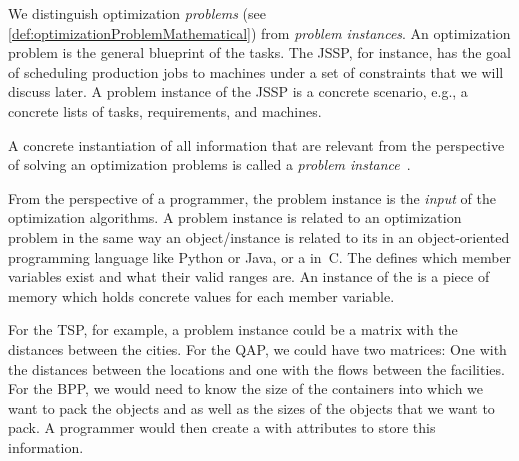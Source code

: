 %
\label{sec:problemInstance}%
%
%
%
We distinguish optimization \emph{problems} (see \autoref{def:optimizationProblemMathematical}) from \emph{problem instances}.
An optimization problem is the general blueprint of the tasks.
The \gls{JSSP}, for instance, has the goal of scheduling production jobs to machines under a set of constraints that we will discuss later.
A problem instance of the \gls{JSSP} is a concrete scenario, e.g., a concrete lists of tasks, requirements, and machines.%
%
\begin{definition}%
\label{def:instance}%
A concrete instantiation of all information that are relevant from the perspective of solving an optimization problems is called a \emph{problem instance}~\instance.%
\end{definition}%
%
%
\endhsection%
%
%
From the perspective of a programmer, the problem instance is the \emph{input} of the optimization algorithms.
A problem instance is related to an optimization problem in the same way an object/instance is related to its  in an object-oriented programming language like Python or Java, or a  in~C.
The  defines which member variables exist and what their valid ranges are.
An instance of the  is a piece of memory which holds concrete values for each member variable.%

For the \gls{TSP}, for example, a problem instance could be a matrix with the distances between the cities.
For the \gls{QAP}, we could have two matrices:
One with the distances between the locations and one with the flows between the facilities.
For the \gls{BPP}, we would need to know the size of the containers into which we want to pack the objects and as well as the sizes of the objects that we want to pack.
A programmer would then create a  with attributes to store this information.

